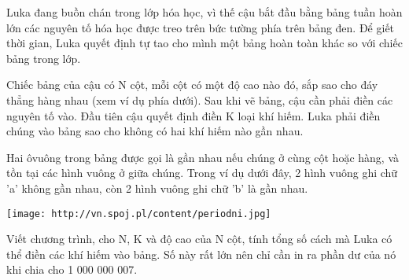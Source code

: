 Luka đang buồn chán trong lớp hóa học, vì thế cậu bắt đầu bằng bảng tuần hoàn lớn các nguyên tố hóa học được treo trên bức tường phía trên bảng đen. Để giết thời gian, Luka quyết định tự tao cho mình một bảng hoàn toàn khác so với chiếc bảng trong lớp.  

   Chiếc bảng của cậu có N cột, mỗi cột có một độ cao nào đó, sắp sao cho đáy thẳng hàng nhau (xem ví dụ phía dưới). Sau khi vẽ bảng, cậu cần phải điền các nguyên tố vào. Đầu tiên cậu quyết định điền K loại khí hiếm. Luka phải điền chúng vào bảng sao cho không có hai khí hiếm nào gần nhau.  

   Hai ôvuông trong bảng được gọi là gần nhau nếu chúng ở cùng cột hoặc hàng, và tồn tại các hình vuông ở giữa chúng. Trong ví dụ dưới đây, 2 hình vuông ghi chữ 'a' không gần nhau, còn 2 hình vuông ghi chữ 'b' là gần nhau.  


\texttt{[image: http://vn.spoj.pl/content/periodni.jpg]}

   Viết chương trình, cho N, K và độ cao của N cột, tính tổng số cách mà Luka có thể điền các khí hiếm vào bảng. Số này rất lớn nên chỉ cần in ra phần dư của nó khi chia cho 1 000 000 007.  

\